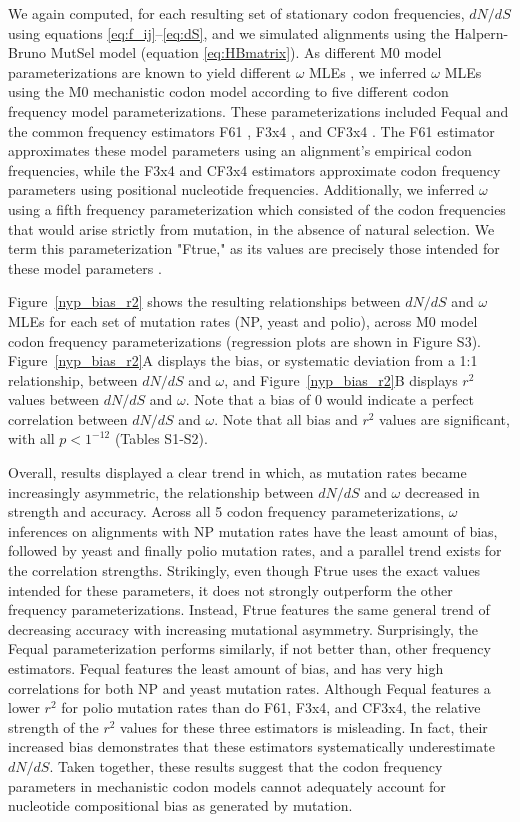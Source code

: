 \documentclass{pnastwo}
\begin{document}
\begin{article}
We again computed, for each resulting set of stationary codon frequencies, $dN/dS$ using equations \eqref{eq:f_ij}--\eqref{eq:dS}, and we simulated alignments using the Halpern-Bruno MutSel model (equation \eqref{eq:HBmatrix}). As different M0 model parameterizations are known to yield different $\omega$ MLEs \cite{ZhangYu2006,Yang2006,Pond2010}, we inferred $\omega$ MLEs using the M0 mechanistic codon model according to five different codon frequency model parameterizations. These parameterizations included Fequal \cite{Yang2006} and the common frequency estimators F61 \cite{GoldmanYang1994}, F3x4 \cite{MuseGaut1994}, and CF3x4 \cite{Pond2010}. The F61 estimator approximates these model parameters using an alignment's empirical codon frequencies, while the F3x4 and CF3x4 estimators approximate codon frequency parameters using positional nucleotide frequencies. Additionally, we inferred $\omega$ using a fifth frequency parameterization which consisted of the codon frequencies that would arise strictly from mutation, in the absence of natural selection. We term this parameterization "Ftrue," as its values are precisely those intended for these model parameters \cite{GoldmanYang1994,MuseGaut1994,YN00,Yang2006}.


Figure~\ref{nyp_bias_r2} shows the resulting relationships between $dN/dS$ and $\omega$ MLEs for each set of mutation rates (NP, yeast and polio), across M0 model codon frequency parameterizations (regression plots are shown in Figure S3). Figure~\ref{nyp_bias_r2}A displays the bias, or systematic deviation from a 1:1 relationship, between $dN/dS$ and $\omega$, and Figure~\ref{nyp_bias_r2}B displays $r^2$ values between $dN/dS$ and $\omega$. Note that a bias of 0 would indicate a perfect correlation between $dN/dS$ and $\omega$. Note that all bias and $r^2$ values are significant, with all $p < 1^{-12}$ (Tables S1-S2). 

Overall, results displayed a clear trend in which, as mutation rates became increasingly asymmetric, the relationship between $dN/dS$ and $\omega$ decreased in strength and accuracy. Across all 5 codon frequency parameterizations, $\omega$ inferences on alignments with NP mutation rates have the least amount of bias, followed by yeast and finally polio mutation rates, and a parallel trend exists for the correlation strengths. Strikingly, even though Ftrue uses the exact values intended for these parameters, it does not strongly outperform the other frequency parameterizations. Instead, Ftrue features the same general trend of decreasing accuracy with increasing mutational asymmetry. Surprisingly, the Fequal parameterization performs similarly, if not better than, other frequency estimators. Fequal features the least amount of bias, and has very high correlations for both NP and yeast mutation rates. Although Fequal features a lower $r^2$ for polio mutation rates than do F61, F3x4, and CF3x4, the relative strength of the $r^2 $ values for these three estimators is misleading. In fact, their increased bias demonstrates that these estimators systematically underestimate $dN/dS$. Taken together, these results suggest that the codon frequency parameters in mechanistic codon models cannot adequately account for nucleotide compositional bias as generated by mutation. 


\end{article}
\end{document}
